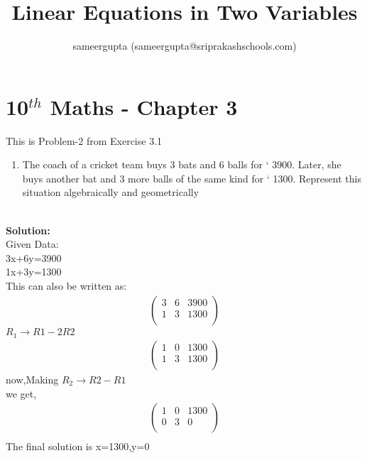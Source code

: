 \documentclass[12pt]{article}
\title{Linear Equations in Two Variables}
\author{sameergupta (sameergupta@sriprakashschools.com)}
\newcommand{\myvec}[1]{\ensuremath{\begin{pmatrix}#1\end{pmatrix}}}
\newcommand{\solution}{\noindent \textbf{Solution: }}
\begin{document}
\maketitle
\section*{10$^{th}$ Maths - Chapter 3}
This is Problem-2 from Exercise 3.1
\begin{enumerate}
\item The coach of a cricket team buys 3 bats and 6 balls for ` 3900. Later, she buys another bat and 3 more balls of the same kind for ` 1300. Represent this situation algebraically and geometrically\\\\
\end{enumerate}
\solution \\
Given Data:\\
            3x+6y=3900\\
            1x+3y=1300\\

This can also be written as:
\begin{align}
\myvec{3&6&3900\\1&3&1300\\}
\end{align}
 $R_1 \xrightarrow\ R1-2R2$\\ 
\begin{align}
\myvec{1&0&1300\\1&3&1300\\}
\end{align}
now,Making $R_2 \xrightarrow\ R2-R1$\\
we get,
\begin{align}
\myvec{1&0&1300\\0&3&0\\}\\

\end{align}
The final solution is x=1300,y=0
\end{document}
